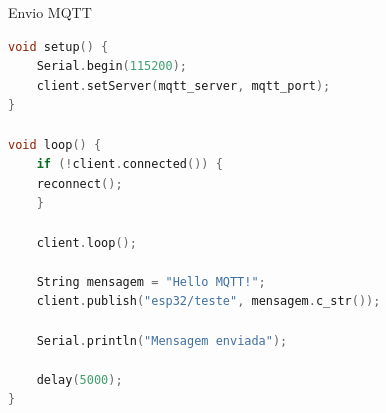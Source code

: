 \begin{frame}[fragile]{Envio MQTT}
\begin{lstlisting}[language=C, basicstyle=\tiny\ttfamily]        
void setup() {
    Serial.begin(115200);
    client.setServer(mqtt_server, mqtt_port);
}

void loop() {
    if (!client.connected()) {
    reconnect();
    }

    client.loop();

    String mensagem = "Hello MQTT!";
    client.publish("esp32/teste", mensagem.c_str());

    Serial.println("Mensagem enviada");

    delay(5000);
}
\end{lstlisting}
\end{frame}
            
            